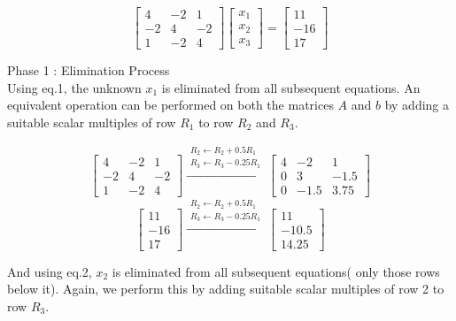 	\[ \begin{bmatrix} 4 & -2 & 1 \\ -2 & 4 & -2 \\ 1 & -2 & 4 \end{bmatrix} \begin{bmatrix} x_1 \\ x_2 \\ x_3 \end{bmatrix} = \begin{bmatrix} 11 \\ -16 \\ 17 \end{bmatrix} \]

	Phase 1 : Elimination Process\\

	Using eq.1, the unknown $x_1$ is eliminated from all subsequent equations.
	An equivalent operation can be performed on both the matrices $A$ and $b$ by adding a suitable scalar multiples of row $R_1$ to row $R_2$ and $R_3$. 

	\[ \begin{bmatrix} 4 & -2 & 1 \\ -2 & 4 & -2 \\ 1 & -2 & 4 \end{bmatrix} \xrightarrow{\substack{R_2 \leftarrow R_2 + 0.5R_1\\ R_3 \leftarrow R_3 - 0.25R_1}} \begin{bmatrix} 4 & -2 & 1 \\ 0 & 3 & -1.5 \\ 0 & -1.5 & 3.75 \end{bmatrix}\]
	\[ \begin{bmatrix} 11 \\ -16 \\ 17 \end{bmatrix} \xrightarrow{\substack{R_2 \leftarrow R_2 + 0.5R_1 \\ R_3 \leftarrow R_3 - 0.25R_1}} \begin{bmatrix} 11 \\ -10.5 \\ 14.25 \end{bmatrix} \]

	And using eq.2, $x_2$ is eliminated from all subsequent equations( only those rows below it).
	Again, we perform this by adding suitable scalar multiples of row 2 to row $R_3$.

